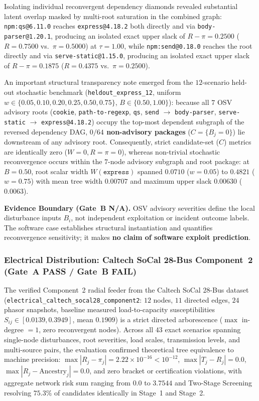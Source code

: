 Isolating individual reconvergent dependency diamonds revealed
substantial latent overlap masked by multi-root saturation in the
combined graph: \texttt{npm:qs@6.11.0} reaches \texttt{express@4.18.2}
both directly and via \texttt{body-parser@1.20.1}, producing an
isolated exact upper slack of $R - \pi = 0.2500$ ($R = 0.7500$ vs.\
$\pi = 0.5000$) at $\tau = 1.00$, while \texttt{npm:send@0.18.0}
reaches the root directly and via \texttt{serve-static@1.15.0},
producing an isolated exact upper slack of $R - \pi = 0.1875$
($R = 0.4375$ vs.\ $\pi = 0.2500$).

An important structural transparency note emerged from the $12$-scenario
held-out stochastic benchmark (\texttt{heldout\_express\_12}, uniform
$w \in \{0.05, 0.10, 0.20, 0.25, 0.50, 0.75\}$, $B \in \{0.50, 1.00\}$):
because all $7$ OSV advisory roots (\texttt{cookie},
\texttt{path-to-regexp}, \texttt{qs}, \texttt{send} $\to$
\texttt{body-parser}, \texttt{serve-static} $\to$ \texttt{express@4.18.2})
occupy the top-most dependent subgraph of the reversed dependency DAG,
\textbf{$0/64$ non-advisory packages} ($C = \{B_j = 0\}$) lie
downstream of any advisory root. Consequently, strict candidate-set
($C$) metrics are identically zero ($W=0, R=\pi=0$), whereas
non-trivial stochastic reconvergence occurs within the $7$-node
advisory subgraph and root package: at $B=0.50$, root scalar width
$W(\texttt{express})$ spanned $0.0710$ ($w=0.05$) to $0.4821$
($w=0.75$) with mean tree width $0.00707$ and maximum upper slack
$0.00630$ ($0.0063$).

\textbf{Evidence Boundary (Gate~B N/A).} OSV advisory severities define
the local disturbance inputs $B_i$, not independent exploitation or
incident outcome labels. The software case establishes structural
instantiation and quantifies reconvergence sensitivity; it makes
\textbf{no claim of software exploit prediction}.

\subsubsection{Electrical Distribution: Caltech SoCal 28-Bus Component~2 (Gate~A PASS / Gate~B FAIL)}

The verified Component~2 radial feeder from the Caltech SoCal 28-Bus
dataset \citep{xie2025} (\texttt{electrical\_\allowbreak caltech\_\allowbreak socal28\_\allowbreak component2}:
$12$ nodes, $11$ directed edges, $24$ phasor snapshots, baseline
measured load-to-capacity susceptibilities $S_{ij} \in [0.0139, 0.3949]$,
mean $0.1909$) is a strict directed arborescence ($\max$ in-degree $= 1$,
zero reconvergent nodes). Across all $43$ exact scenarios spanning
single-node disturbances, root severities, load scales, transmission
levels, and multi-source pairs, the evaluation confirmed theoretical
tree equivalence to machine precision: $\max |R_j - \pi_j| =
2.22 \times 10^{-16} < 10^{-12}$, $\max |T_j - R_j| = 0.0$,
$\max |R_j - \text{Ancestry}_j| = 0.0$, and zero bracket or
certification violations, with aggregate network risk sum ranging from
$0.0$ to $3.7544$ and Two-Stage Screening resolving $75.3\%$ of
candidates identically in Stage~1 and Stage~2.

